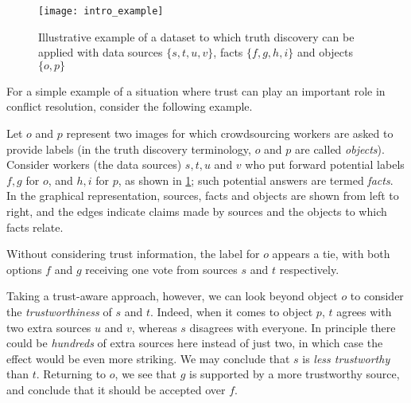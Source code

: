 

\begin{figure}[b]
\centering
\texttt{[image: intro\_example]}
\caption{
    Illustrative example of a dataset to which truth discovery can be applied
    with data sources $\{s, t, u, v\}$, facts $\{f, g, h, i\}$ and objects
    $\{o, p\}$
}
\label{td_fig_intro_example}
\end{figure}

For a simple example of a situation where trust can play an important role in
conflict resolution, consider the following example.

\begin{example}
\label{ex:intro_example}

Let $o$ and $p$ represent two images for which crowdsourcing workers are asked
to provide labels (in the truth discovery terminology, $o$ and $p$ are called
\emph{objects}). Consider workers (the data sources) $s, t, u$ and $v$ who put
forward potential labels $f, g$ for $o$, and $h, i$ for $p$, as shown in
\cref{td_fig_intro_example}; such potential answers are termed \emph{facts}. In the
graphical representation, sources, facts and objects are shown from left to
right, and the edges indicate claims made by sources and the objects to which
facts relate.

Without considering trust information, the label for $o$ appears a tie, with
both options $f$ and $g$ receiving one vote from sources $s$ and $t$
respectively.

Taking a trust-aware approach, however, we can look beyond object $o$ to
consider the \emph{trustworthiness} of $s$ and $t$. Indeed, when it comes to
object $p$, $t$ agrees with two extra sources $u$ and $v$, whereas $s$
disagrees with everyone. In principle there could be \emph{hundreds} of extra
sources here instead of just two, in which case the effect would be even more
striking. We may conclude that $s$ is \emph{less trustworthy} than $t$.
Returning to $o$, we see that $g$ is supported by a more trustworthy source,
and conclude that it should be accepted over $f$.

\end{example}

